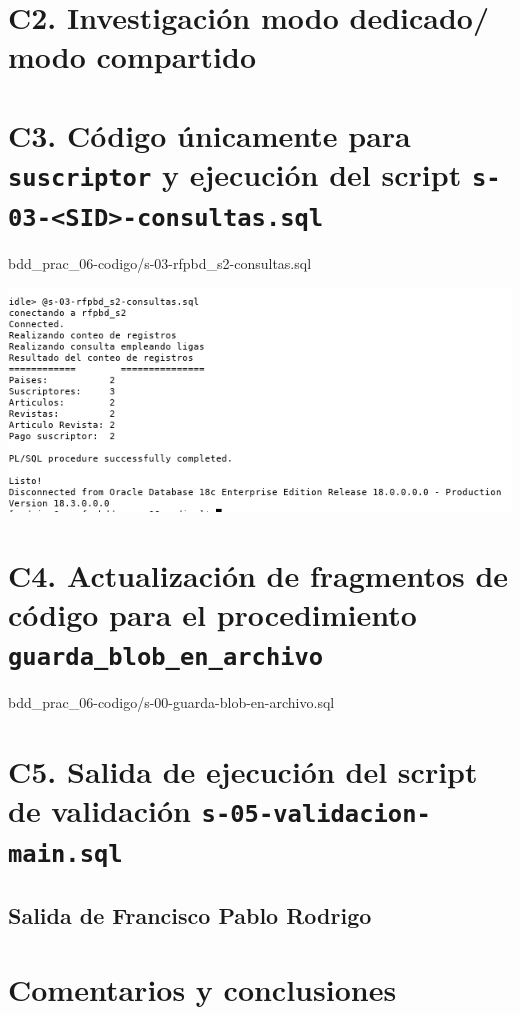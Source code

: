 \documentclass{article}
\newcommand{\codedir}{bdd_prac_06-codigo}
\begin{document}
\section*{C2. Investigación modo dedicado/ modo compartido }


\section*{C3. Código únicamente para \texttt{suscriptor} y ejecución del 
  script \texttt{s-03-<SID>-consultas.sql}}


  {\codedir/s-03-rfpbd_s2-consultas.sql}

  \includegraphics[width=0.8\linewidth]{rfp_c3}

\section*{C4. Actualización de fragmentos de código para el procedimiento 
  \texttt{guarda\_blob\_en\_archivo}}

  
  {\codedir/s-00-guarda-blob-en-archivo.sql}

\section*{C5. Salida de ejecución del script de validación 
  \texttt{s-05-validacion-main.sql}}

  \subsection*{Salida de Francisco Pablo Rodrigo}

  

\section*{Comentarios y conclusiones}
\end{document}
